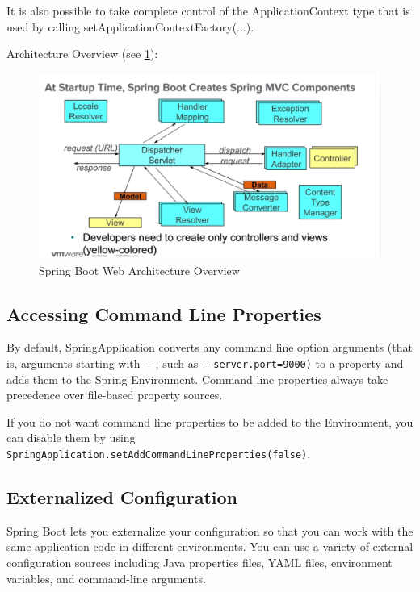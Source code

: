 \documentclass{scrartcl}
\begin{document}
It is also possible to take complete control of the ApplicationContext type that is used by calling setApplicationContextFactory(...).


Architecture Overview (see \ref{fig:spring-web}):

\begin{figure}[h]
    \centering
    \includegraphics[width=1\linewidth]{spring-web}
    \caption{Spring Boot Web Architecture Overview}
    \label{fig:spring-web}
\end{figure}

\subsection{Accessing Command Line Properties}

By default, SpringApplication converts any command line option arguments (that is, arguments
starting with \lstinline|--|, such as \lstinline|--server.port=9000)| to a property and adds them to the Spring Environment.
Command line properties always take precedence over file-based
property sources.

If you do not want command line properties to be added to the Environment, you can disable them
by using \lstinline|SpringApplication.setAddCommandLineProperties(false)|.

\subsection{Externalized Configuration}

Spring Boot lets you externalize your configuration so that you can work with the same application code in different environments. You can use a variety of external configuration sources including Java properties files, YAML files, environment variables, and command-line arguments.
\end{document}
